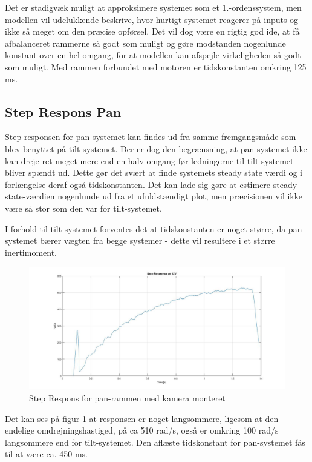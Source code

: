 Det er stadigvæk muligt at approksimere systemet som et 1.-ordenssystem, men modellen vil udelukkende beskrive, hvor hurtigt systemet reagerer på inputs og ikke så meget om den præcise opførsel. Det vil dog være en rigtig god ide, at få afbalanceret rammerne så godt som muligt og gøre modstanden nogenlunde konstant over en hel omgang, for at modellen kan afspejle virkeligheden så godt som muligt. Med rammen forbundet med motoren er tidskonstanten omkring 125 ms.

\subsection{Step Respons Pan}

Step responsen for pan-systemet kan findes ud fra samme fremgangsmåde som blev benyttet på tilt-systemet. Der er dog den begrænsning, at pan-systemet ikke kan dreje ret meget mere end en halv omgang før ledningerne til tilt-systemet bliver spændt ud. Dette gør det svært at finde systemets steady state værdi og i forlængelse deraf også tidskonstanten. Det kan lade sig gøre at estimere steady state-værdien nogenlunde ud fra et ufuldstændigt plot, men præcisionen vil ikke være så stor som den var for tilt-systemet. 

I forhold til tilt-systemet forventes det at tidskonstanten er noget større, da pan-systemet bærer vægten fra begge systemer - dette vil resultere i et større inertimoment. 

\begin{figure}[!ht]
	\begin{center}
		\includegraphics[scale=0.35]{Billeder/Pan_Response.jpg}
	\end{center}
	\caption{Step Respons for pan-rammen med kamera monteret}
	\label{fig:Pan_Response}
\end{figure}

Det kan ses på figur \ref{fig:Pan_Response} at responsen er noget langsommere, ligesom at den endelige omdrejningshastiged, på ca 510 rad/s, også er omkring 100 rad/s langsommere end for tilt-systemet. Den aflæste tidskonstant for pan-systemet fås til at være ca. 450 ms.

